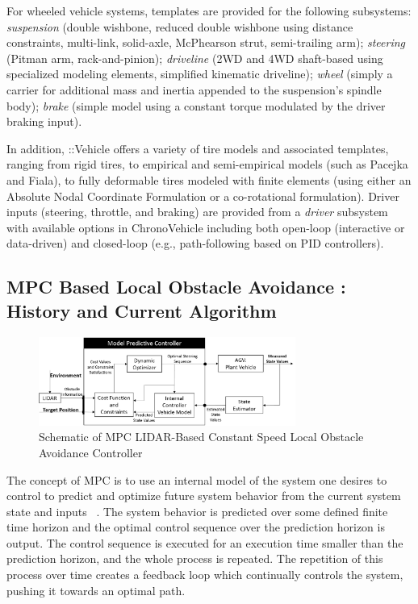\documentclass[12pt,onecolumn]{article}
\newcommand{\CHRONO}{{\sffamily{{Chrono}}}}
\newcommand{\ChronoVehicle}{{\sffamily{Chrono}}::Vehicle}
\begin{document}
For wheeled vehicle systems, templates are provided for the following subsystems:
{\em suspension} (double wishbone, reduced double wishbone using distance constraints, multi-link, solid-axle, McPhearson strut, semi-trailing arm);
{\em steering} (Pitman arm, rack-and-pinion);
{\em driveline} (2WD and 4WD shaft-based using specialized {\CHRONO} modeling elements, simplified kinematic driveline);
{\em wheel} (simply a carrier for additional mass and inertia appended to the suspension's spindle body);
{\em brake} (simple model using a constant torque modulated by the driver braking input).

In addition, {\ChronoVehicle} offers a variety of tire models and associated templates, ranging from rigid tires, to empirical and semi-empirical models (such as Pacejka and Fiala), to fully deformable tires modeled with finite elements (using either an Absolute Nodal Coordinate Formulation or a co-rotational formulation).  Driver inputs (steering, throttle, and braking) are provided from a {\em driver} subsystem with available options in {ChronoVehicle} including both open-loop (interactive or data-driven) and closed-loop (e.g., path-following based on PID controllers).


\subsection{MPC Based Local Obstacle Avoidance : History and Current Algorithm }\label{MPC}


\begin{figure}
	\centering
	\includegraphics[width=0.75\textwidth]{Figs/MPCBlockDiagram.png}
	\caption{{\small Schematic of MPC LIDAR-Based Constant Speed Local Obstacle Avoidance Controller}}    
	\label{fig:MPC_schematic}
\end{figure}

The concept of MPC is to use an internal model of the system one desires to control to predict and optimize future system behavior from the current system state and inputs ~\cite{Allgower&Findeisen2002}. The system behavior is predicted over some defined finite time horizon and the optimal control sequence over the prediction horizon is output. The control sequence is executed for an execution time smaller than the prediction horizon, and the whole process is repeated. The repetition of this process over time creates a feedback loop which continually controls the system, pushing it towards an optimal path.
\end{document}
